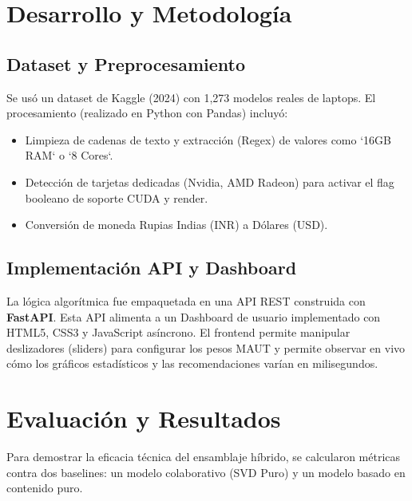 \documentclass[12pt,a4paper]{report}
\begin{document}
\chapter{Desarrollo y Metodología}
\section{Dataset y Preprocesamiento}
Se usó un dataset de Kaggle (2024) con 1,273 modelos reales de laptops.
El procesamiento (realizado en Python con Pandas) incluyó:
\begin{itemize}
    \item Limpieza de cadenas de texto y extracción (Regex) de valores como `16GB RAM` o `8 Cores`.
    \item Detección de tarjetas dedicadas (Nvidia, AMD Radeon) para activar el flag booleano de soporte CUDA y render.
    \item Conversión de moneda Rupias Indias (INR) a Dólares (USD).
\end{itemize}

\section{Implementación API y Dashboard}
La lógica algorítmica fue empaquetada en una API REST construida con \textbf{FastAPI}. Esta API alimenta a un Dashboard de usuario implementado con HTML5, CSS3 y JavaScript asíncrono.
El frontend permite manipular deslizadores (sliders) para configurar los pesos MAUT y permite observar en vivo cómo los gráficos estadísticos y las recomendaciones varían en milisegundos.

\chapter{Evaluación y Resultados}
Para demostrar la eficacia técnica del ensamblaje híbrido, se calcularon métricas contra dos baselines: un modelo colaborativo (SVD Puro) y un modelo basado en contenido puro.
\end{document}
